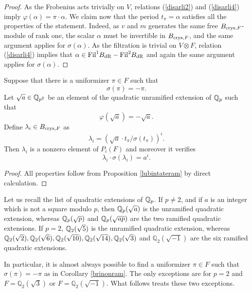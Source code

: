 \documentclass[11pt]{amsart}
\begin{document}
\begin{proof}
As the Frobenius acts trivially on $V$, relations (\ref{disarli2}) and (\ref{disarli4}) imply $ \varphi(\alpha) = \pi  \cdot \alpha$. We claim now that the period $t_\pi=\alpha$ satisfies all the properties of the statement. Indeed, as $v$ and $m$ generates the same free  $B_{\textnormal{crys},F}$-module of rank one, the scalar $\alpha$ must be invertible in $B_{\textnormal{crys},F}$, and the same argument applies for $ \sigma(\alpha)$. As the filtration is trivial on $V \otimes F$, relation   (\ref{disarli4}) implies that $\alpha \in \textnormal{Fil} ^{1} B_{\mathrm{dR}}-\textnormal{Fil} ^{2} B_{\mathrm{dR}}$ and again the same argument applies for $ \sigma(\alpha)$.
 \end{proof}
\begin{corollary}\label{brinonram}
Suppose that there is a uniformizer $\pi\in F$ such that 
\[\sigma(\pi)=-\pi.\]
Let $\sqrt{a}\in \mathbb{Q}_{p^2}$ be an element of the quadratic unramified extension of $\mathbb{Q}_p$ such that
\[\varphi(\sqrt{a}) = -\sqrt{a}.\]
Define $\lambda_i \in B_{\textnormal{crys},F}$ as
\[\lambda_i = (\sqrt{a}  \cdot t_\pi/ \sigma(t_\pi))^i .\]
Then $\lambda_i$ is a nonzero element of  $P_i(F)$ and moreover it verifies
\[\lambda_i \cdot\sigma(\lambda_i) = a^i.\] 
\end{corollary}
\begin{proof}
All properties follow from  Proposition \ref{lubintateram} by direct calculation.
\end{proof}

\begin{remark}\label{remtame}
Let us recall the list of quadratic extensions of $\mathbb{Q}_p$. If $p\neq 2$, and if $a$ is an integer which is not a square modulo $p$, then $\mathbb{Q}_p(\sqrt{a})$ is the unramified quadratic extension, whereas $\mathbb{Q}_p(\sqrt{p})$ and $\mathbb{Q}_p(\sqrt{ap})$ are the two ramified quadratic extensions. 
If $p=2$,  $\mathbb{Q}_2(\sqrt{5})$ is the unramified quadratic extension, whereas $\mathbb{Q}_2(\sqrt{2}),\mathbb{Q}_2(\sqrt{6}),\mathbb{Q}_2(\sqrt{10}),\mathbb{Q}_2(\sqrt{14}),\mathbb{Q}_2(\sqrt{3})$ and $\mathbb{Q}_2(\sqrt{-1})$ are the six ramified quadratic extensions. 

In particular, it is almost always possible to find a uniformizer $\pi\in F$ such that 
$\sigma(\pi)=-\pi$ as in  Corollary \ref{brinonram}. The only exceptions are for  $p=2$ and  $F=\mathbb{Q}_2(\sqrt{3})$ or  $F=\mathbb{Q}_2(\sqrt{-1})$.  What follows treats these two exceptions.
\end{remark}
\end{document}
